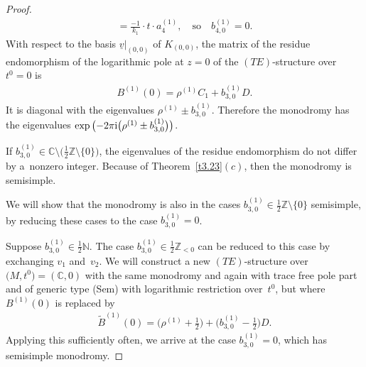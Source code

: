\documentclass[10pt,a4paper]{amsart}
\numberwithin{equation}{section}
\numberwithin{figure}{section}
\newcommand{\N}{{\mathbb N}}
\newcommand{\Z}{{\mathbb Z}}
\newcommand{\C}{{\mathbb C}}
\newcommand{\www}{\widetilde}
\newcommand{\uuuu}{\underline}
\begin{document}
\begin{proof}
\begin{align*}
= \frac{-1}{k_1} \cdot t \cdot a_4^{(1)},\quad
\text{so}\quad b_{4,0}^{(1)}=0.
\end{align*}
With respect to the basis $\uuuu{v}|_{(0,0)}$ of $K_{(0,0)}$,
the matrix of the residue endomorphism of the logarithmic
pole at $z=0$ of the $(TE)$-structure over $t^0=0$ is
\begin{gather*}
B^{(1)}(0)= \rho^{(1)}C_1+b_{3,0}^{(1)}D.
\end{gather*}
It is diagonal with the eigenvalues $\rho^{(1)}\pm b_{3,0}^{(1)}$.
Therefore the monodromy has the eigenvalues
$\exp\big({-}2\pi {\rm i}\big(\rho^{(1)}\pm b_{3,0}^{(1)}\big)\big)$.

If $b_{3,0}^{(1)}\in\C\setminus \big(\frac{1}{2}\Z\setminus\{0\}\big)$, the eigenvalues
of the residue endomorphism do not differ by a~nonzero integer.
Because of Theorem~\ref{t3.23}$(c)$, then the monodromy is
semisimple.

We will show that the monodromy is also in the cases
$b_{3,0}^{(1)}\in\frac{1}{2}\Z\setminus\{0\}$ semisimple,
by reducing these cases to the case $b_{3,0}^{(1)}=0$.

Suppose $b_{3,0}^{(1)}\in\frac{1}{2}\N$. The case
$b_{3,0}^{(1)}\in \frac{1}{2}\Z_{<0}$ can be reduced to this
case by exchanging $v_1$ and~$v_2$.
We will construct a new $(TE)$-structure over $\big(M,t^0\big)=(\C,0)$
with the same monodromy and again with trace free pole part and
of generic type (Sem)
with logarithmic restriction over~$t^0$, but where
$B^{(1)}(0)$ is replaced by
\begin{gather*}%
\www B^{(1)}(0)=\bigg(\rho^{(1)}+\frac{1}{2}\bigg)+
\bigg(b_{3,0}^{(1)}-\frac{1}{2}\bigg)D.
\end{gather*}
Applying this sufficiently often, we arrive at the case
$b_{3,0}^{(1)}=0$, which has semisimple monodromy.


\end{proof}
\end{document}
